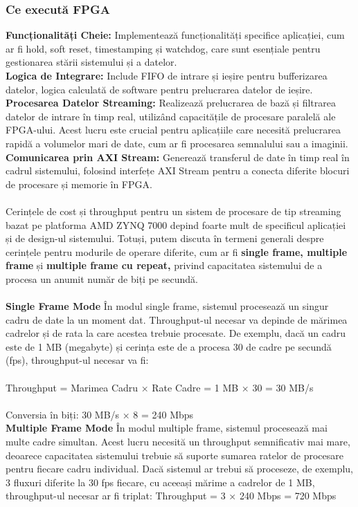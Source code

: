 \documentclass[12pt]{article}
\begin{document}
\subsubsection{Ce execută FPGA}
\textbf{Funcționalități Cheie:} Implementează funcționalități specifice aplicației, cum ar fi hold, soft reset, timestamping și watchdog, care sunt esențiale pentru gestionarea stării sistemului și a datelor.\\
\textbf{Logica de Integrare:} Include FIFO de intrare și ieșire pentru bufferizarea datelor, logica calculată de software pentru prelucrarea datelor de ieșire.\\
\textbf{Procesarea Datelor Streaming:} Realizează prelucrarea de bază și filtrarea datelor de intrare în timp real, utilizând capacitățile de procesare paralelă ale FPGA-ului. Acest lucru este crucial pentru aplicațiile care necesită prelucrarea rapidă a volumelor mari de date, cum ar fi procesarea semnalului sau a imaginii.\\
\textbf{Comunicarea prin AXI Stream:} Generează transferul de date în timp real în cadrul sistemului, folosind interfețe AXI Stream pentru a conecta diferite blocuri de procesare și memorie în FPGA.\\\\
Cerințele de cost și throughput pentru un sistem de procesare de tip streaming bazat pe platforma AMD ZYNQ 7000 depind foarte mult de specificul aplicației și de design-ul sistemului. Totuși, putem discuta în termeni generali despre cerințele pentru modurile de operare diferite, cum ar fi \textbf{single frame, multiple frame} și \textbf{multiple frame cu repeat,} privind capacitatea sistemului de a procesa un anumit număr de biți pe secundă.\\\\

\textbf{Single Frame Mode}
În modul single frame, sistemul procesează un singur cadru de date la un moment dat. Throughput-ul necesar va depinde de mărimea cadrelor și de rata la care acestea trebuie procesate. De exemplu, dacă un cadru este de 1 MB (megabyte) și cerința este de a procesa 30 de cadre pe secundă (fps), throughput-ul necesar va fi:
\\\\Throughput = Marimea Cadru × Rate Cadre = 1 MB × 30 = 30 MB/s\\\\
Conversia în biți: 30 MB/s × 8 = 240 Mbps\\

\textbf{Multiple Frame Mode}
În modul multiple frame, sistemul procesează mai multe cadre simultan. Acest lucru necesită un throughput semnificativ mai mare, deoarece capacitatea sistemului trebuie să suporte sumarea ratelor de procesare pentru fiecare cadru individual. Dacă sistemul ar trebui să proceseze, de exemplu, 3 fluxuri diferite la 30 fps fiecare, cu aceeași mărime a cadrelor de 1 MB, throughput-ul necesar ar fi triplat:
Throughput = 3 × 240 Mbps = 720 Mbps\\\\
\end{document}
